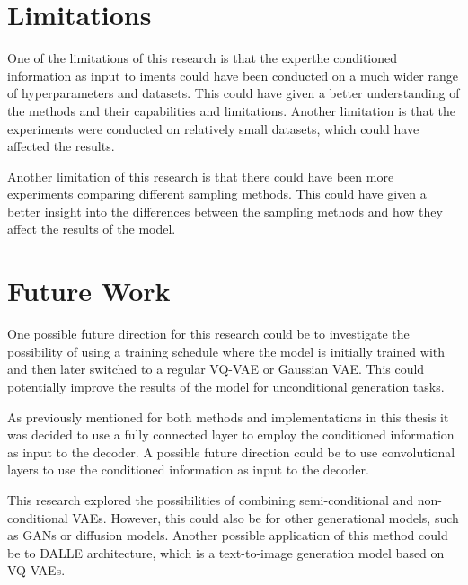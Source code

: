 
\section{Limitations}

One of the limitations of this research is that the experthe conditioned information as input to iments could have been conducted on a much wider range of hyperparameters and datasets. This could have given a better understanding of the methods and their capabilities and limitations. Another limitation is that the experiments were conducted on relatively small datasets, which could have affected the results.

Another limitation of this research is that there could have been more experiments comparing different sampling methods. This could have given a better insight into the differences between the sampling methods and how they affect the results of the model.

\section{Future Work}

One possible future direction for this research could be to investigate the possibility of using a training schedule where the model is initially trained with  and then later switched to a regular VQ-VAE or Gaussian VAE. This could potentially improve the results of the model for unconditional generation tasks.

As previously mentioned for both methods and implementations in this thesis it was decided to use a fully connected layer to employ the conditioned information as input to the decoder. A possible future direction could be to use convolutional layers to use the conditioned information as input to the decoder.

This research explored the possibilities of combining semi-conditional and non-conditional VAEs. However, this could also be for other generational models, such as GANs or diffusion models. Another possible application of this method could be to DALLE architecture, which is a text-to-image generation model based on VQ-VAEs.